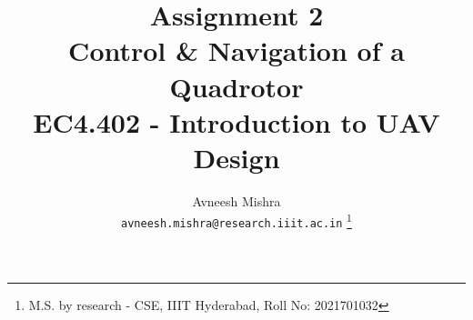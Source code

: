 

{
   \fancyhf{}
   \renewcommand{\headrulewidth}{0pt} %
}

\title{Assignment 2 \\
    \Large Control \& Navigation of a Quadrotor \\
    \small EC4.402 - Introduction to UAV Design
}

\author{
    Avneesh Mishra \\
    \texttt{avneesh.mishra@research.iiit.ac.in}
    \thanks{M.S. by research - CSE, IIIT Hyderabad, Roll No: 2021701032}
}


    \maketitle
    \thispagestyle{fancy_tr_rno}
    \tableofcontents
    \pagebreak
    
    \pagebreak
    
    \pagebreak
    \printbibliography
    \appendix
    

